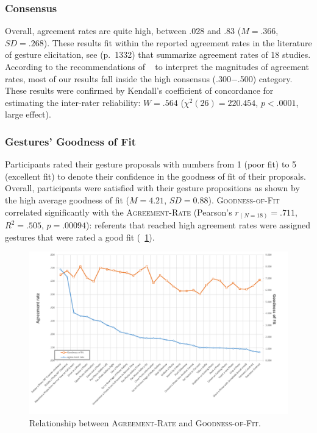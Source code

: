 \subsubsection{Consensus}
Overall, agreement rates are quite high, between .028 and .83 ($M{=}.366$, $SD{=}.268$). These results fit within the reported agreement rates in the literature of gesture elicitation, see \cite{Vatavu:2015} (\mbox{p. 1332}) that summarize agreement rates of 18 studies. According to the recommendations of ~\cite{Vatavu:2015} to interpret the magnitudes of agreement rates, most of our results fall inside the high consensus (.300$-$.500) category. These results were confirmed by Kendall's coefficient of concordance for estimating the inter-rater reliability: $W{=}.564$ ($\chi^2(26){=}220.454$, $p{<}.0001$, large effect).

\subsubsection{Gestures' Goodness of Fit}
Participants rated their gesture proposals with numbers from 1 (poor fit) to 5 (excellent fit) to denote their confidence in the goodness of fit of their proposals. Overall, participants were satisfied with their gesture propositions as shown by the high average goodness of fit ($M{=}4.21$, $SD{=}0.88$).
\textsc{Goodness-of-Fit} correlated significantly with the \textsc{Agreement-Rate} (Pearson's $r_{(N{=}18)}{=}.711$, $R^2{=}.505$, $p{=}.00094$): referents that reached high agreement rates were assigned gestures that were rated a good fit (\fig~\ref{fig:goodness-of-fit}).

\begin{figure}
    \centering
    \captionsetup{justification=centering}
    \includegraphics[width=.99\linewidth]{Figures/App-LUIGES/goodness-of-fit.pdf}
    \caption{Relationship between \textsc{Agreement-Rate} and \textsc{Goodness-of-Fit}.}
    \label{fig:goodness-of-fit}
\end{figure}

